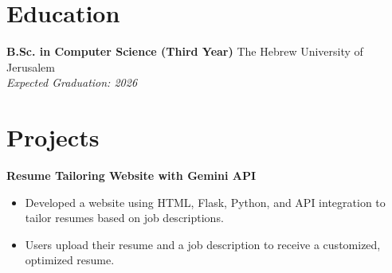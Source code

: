 \documentclass[a4paper,10pt]{article}
\begin{document}
\section*{Education}
\textbf{B.Sc. in Computer Science (Third Year)} \hfill The Hebrew University of Jerusalem \\
\textit{Expected Graduation: 2026}


\section*{Projects}
\textbf{Resume Tailoring Website with Gemini API}
\begin{itemize}[noitemsep,nolistsep]
    \item Developed a website using HTML, Flask, Python, and API integration to tailor resumes based on job descriptions.
    \item Users upload their resume and a job description to receive a customized, optimized resume.
\end{itemize}
\end{document}
